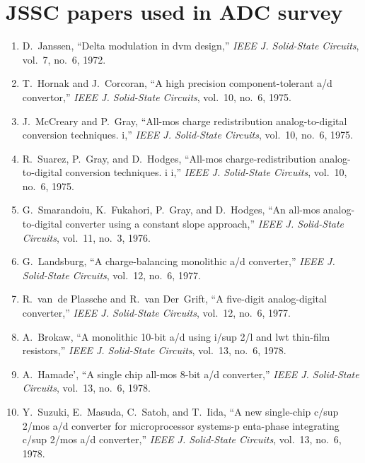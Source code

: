\twocolumn
\chapter{JSSC papers used in ADC survey}


\begin{enumerate}
\renewcommand\labelenumi{[\theenumi]}


\item
D.~Janssen, ``Delta modulation in dvm design,'' \emph{{IEEE} J. Solid-State
  Circuits}, vol.~7, no.~6, 1972.

\item
T.~Hornak and J.~Corcoran, ``A high precision component-tolerant a/d
  convertor,'' \emph{{IEEE} J. Solid-State Circuits}, vol.~10, no.~6, 1975.

\item
J.~McCreary and P.~Gray, ``All-mos charge redistribution analog-to-digital
  conversion techniques. i,'' \emph{{IEEE} J. Solid-State Circuits}, vol.~10,
  no.~6, 1975.

\item
R.~Suarez, P.~Gray, and D.~Hodges, ``All-mos charge-redistribution
  analog-to-digital conversion techniques. i i,'' \emph{{IEEE} J. Solid-State
  Circuits}, vol.~10, no.~6, 1975.

\item
G.~Smarandoiu, K.~Fukahori, P.~Gray, and D.~Hodges, ``An all-mos
  analog-to-digital converter using a constant slope approach,'' \emph{{IEEE}
  J. Solid-State Circuits}, vol.~11, no.~3, 1976.

\item
G.~Landsburg, ``A charge-balancing monolithic a/d converter,'' \emph{{IEEE} J.
  Solid-State Circuits}, vol.~12, no.~6, 1977.

\item
R.~van~de Plassche and R.~van Der~Grift, ``A five-digit analog-digital
  converter,'' \emph{{IEEE} J. Solid-State Circuits}, vol.~12, no.~6, 1977.

\item
A.~Brokaw, ``A monolithic 10-bit a/d using i/sup 2/l and lwt thin-film
  resistors,'' \emph{{IEEE} J. Solid-State Circuits}, vol.~13, no.~6, 1978.

\item
A.~Hamade', ``A single chip all-mos 8-bit a/d converter,'' \emph{{IEEE} J.
  Solid-State Circuits}, vol.~13, no.~6, 1978.

\item
Y.~Suzuki, E.~Masuda, C.~Satoh, and T.~Iida, ``A new single-chip c/sup 2/mos
  a/d converter for microprocessor systems-p enta-phase integrating c/sup 2/mos
  a/d converter,'' \emph{{IEEE} J. Solid-State Circuits}, vol.~13, no.~6, 1978.


\end{enumerate}
